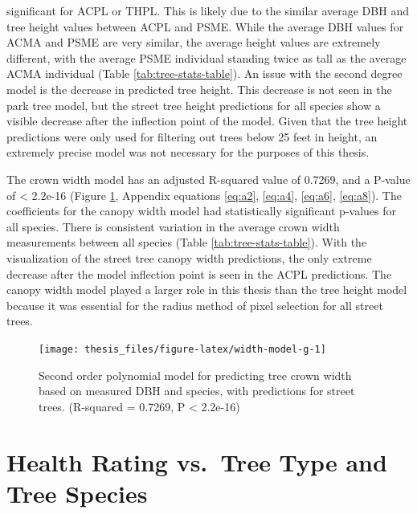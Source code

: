 \documentclass[12pt,twoside]{reedthesis}
\begin{document}
significant for ACPL or THPL. This is likely due to the similar average
DBH and tree height values between ACPL and PSME. While the average DBH
values for ACMA and PSME are very similar, the average height values are
extremely different, with the average PSME individual standing twice as
tall as the average ACMA individual (Table \ref{tab:tree-stats-table}).
An issue with the second degree model is the decrease in predicted tree
height. This decrease is not seen in the park tree model, but the street
tree height predictions for all species show a visible decrease after
the inflection point of the model. Given that the tree height
predictions were only used for filtering out trees below 25 feet in
height, an extremely precise model was not necessary for the purposes of
this thesis.

The crown width model has an adjusted R-squared value of 0.7269, and a
P-value of \textless{} 2.2e-16 (Figure \ref{fig:width-model-g}, Appendix
equations \eqref{eq:a2}, \eqref{eq:a4}, \eqref{eq:a6}, \eqref{eq:a8}). The
coefficients for the canopy width model had statistically significant
p-values for all species. There is consistent variation in the average
crown width measurements between all species (Table
\ref{tab:tree-stats-table}). With the visualization of the street tree
canopy width predictions, the only extreme decrease after the model
inflection point is seen in the ACPL predictions. The canopy width model
played a larger role in this thesis than the tree height model because
it was essential for the radius method of pixel selection for all street
trees.
\begin{figure}

{\centering \texttt{[image: thesis\_files/figure-latex/width-model-g-1]} 

}

\caption[Crown width predictive model]{Second order polynomial model for predicting tree crown width based on measured DBH and species, with predictions for street trees. (R-squared = 0.7269,  P < 2.2e-16)}\label{fig:width-model-g}
\end{figure}
\hypertarget{health-rating-vs.-tree-type-and-tree-species}{%
\section{Health Rating vs.~Tree Type and Tree Species}\label{health-rating-vs.-tree-type-and-tree-species}}
\end{document}
